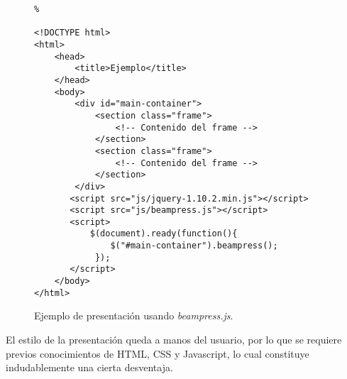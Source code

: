 		\begin{figure}[htb]%
			\begin{lstlisting}%

<!DOCTYPE html>
<html>
	<head>
    	<title>Ejemplo</title>
	</head>
	<body>
		<div id="main-container">
			<section class="frame">
				<!-- Contenido del frame -->
			</section>
			<section class="frame">
				<!-- Contenido del frame -->
			</section>						
		</div>
	   <script src="js/jquery-1.10.2.min.js"></script>
	   <script src="js/beampress.js"></script>
	   <script>
	       $(document).ready(function(){     
	           $("#main-container").beampress();
	        });
	   </script>		
	</body>
</html>			
			\end{lstlisting}
		\caption{
			Ejemplo de presentación usando \textit{beampress.js}. 
			\label{fig:ex5} }
		\end{figure}	

	El estilo de la presentación queda a manos del usuario, por lo que se requiere previos conocimientos 
	de HTML, CSS y Javascript, lo cual constituye indudablemente una cierta desventaja. 
		
